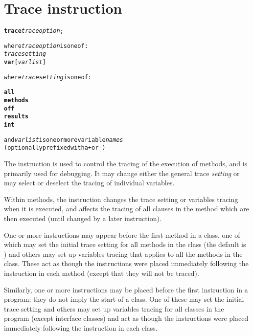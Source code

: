 \chapter{Trace instruction}\label{reftrace}
\index{,}
\index{,}
\begin{shaded}
\begin{alltt}
\textbf{trace} \emph{traceoption};

where \emph{traceoption} is one of:
    \emph{tracesetting}
    \textbf{var} [\emph{varlist}]

where \emph{tracesetting} is one of:

    \textbf{all}
    \textbf{methods}
    \textbf{off}
    \textbf{results}
    \textbf{int}

    and \emph{varlist} is one or more variable \emph{names}
    (optionally prefixed with a \texttt{+} or \texttt{-})
\end{alltt}
\end{shaded}
 The  instruction is used to control the tracing of the
execution of \nr{} methods, and is primarily used for debugging.
It may change either the general trace \emph{setting} or may select
or deselect the tracing of individual variables.
 
Within methods, the  instruction changes the trace setting
or variables tracing when it is executed, and affects the tracing of
all clauses in the method which are then executed (until changed by a
later  instruction).
 
One or more  instructions may appear before the first
method in a class, one of which may set the initial trace setting
for all methods in the class (the default is ) and others
may set up variables tracing that applies to all the methods in the
class.
These act as though the  instructions were
placed immediately following the  instruction in each
method (except that they will not be traced).
 
Similarly, one or more  instructions may be placed
before the first  instruction in a program; they do not
imply the start of a class.  One of these may set the initial trace
setting and others may set up variables tracing for all classes in
the program (except interface classes) and act as though the
 instructions were placed immediately following the
 instruction in each class.

